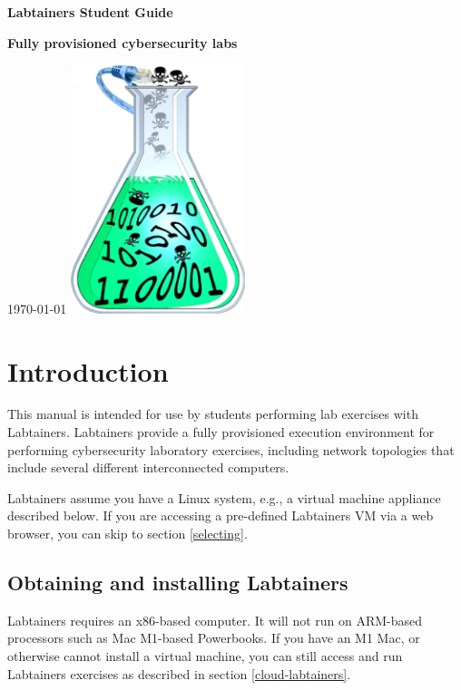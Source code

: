 \documentclass[12pt]{article}
\begin{document}
\begin{titlepage}
\centering
\vfill
\vspace*{4\baselineskip}
{\bfseries\Large
Labtainers Student Guide\par
}
\vspace*{4\baselineskip}
{\bfseries
Fully provisioned cybersecurity labs\par
}
\vspace*{2\baselineskip}
\today
\vfill
\includegraphics[width=2in]{labtainer5-sm.png}
\vfill
\end{titlepage}

\section {Introduction}
This manual is intended for use by students performing lab exercises with Labtainers.
Labtainers provide a fully provisioned execution environment for performing
cybersecurity laboratory exercises, including network topologies that include several different
interconnected computers.

Labtainers assume you have a Linux system, e.g., a virtual machine appliance described below.
If you are accessing a pre-defined Labtainers VM via a web browser, you can skip to section \ref{selecting}.

\subsection{Obtaining and installing Labtainers}
Labtainers requires an x86-based computer.  It will not run on ARM-based processors such as 
Mac M1-based Powerbooks.  If you have an M1 Mac, or otherwise cannot install a virtual machine,
you can still access and run Labtainers exercises as described in section \ref{cloud-labtainers}.
\end{document}
